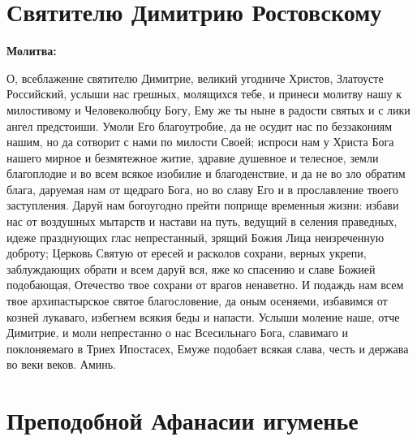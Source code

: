 \bigskip\bigskip\mychapterending


 

\section{Святителю Димитрию Ростовскому}
 

\bfseries Молитва:\normalfont{}


О, всеблаженне святителю Димитрие, великий угодниче Христов, Златоусте Российский, услыши нас грешных, молящихся тебе, и принеси молитву нашу к милостивому и Человеколюбцу Богу, Ему же ты ныне в радости святых и с лики ангел предстоиши. Умоли Его благоутробие, да не осудит нас по беззакониям нашим, но да сотворит с нами по милости Своей; испроси нам у Христа Бога нашего мирное и безмятежное житие, здравие душевное и телесное, земли благоплодие и во всем всякое изобилие и благоденствие, и да не во зло обратим блага, даруемая нам от щедраго Бога, но во славу Его и в прославление твоего заступления. Даруй нам богоугодно прейти поприще временныя жизни: избави нас от воздушных мытарств и настави на путь, ведущий в селения праведных, идеже празднующих глас непрестанный, зрящий Божия Лица неизреченную доброту; Церковь Святую от ересей и расколов сохрани, верных укрепи, заблуждающих обрати и всем даруй вся, яже ко спасению и славе Божией подобающая, Отечество твое сохрани от врагов ненаветно. И подаждь нам всем твое архипастырское святое благословение, да оным осеняеми, избавимся от козней лукаваго, избегнем всякия беды и напасти. Услыши моление наше, отче Димитрие, и моли непрестанно о нас Всесильнаго Бога, славимаго и поклоняемаго в Триех Ипостасех, Емуже подобает всякая слава, честь и держава во веки веков. Аминь.


\bigskip\bigskip\mychapterending


 

\section{Преподобной Афанасии игуменье}
 


